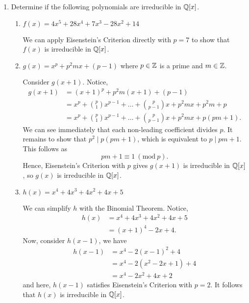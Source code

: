 \documentclass[answers]{exam}
\newcommand{\Mod}[1]{\ (\mathrm{mod}\ #1)}
\begin{document}
\begin{enumerate}
\item Determine if the following polynomials are irreducible in $\mathbb{Q}[x]$.
\begin{enumerate}
\item $f(x) = 4x^5 + 28x^4 + 7x^3 - 28x^2 + 14$
\begin{solution}
We can apply Eisenstein's Criterion directly with $p=7$ to show that
$f(x)$ is irreducible in $\mathbb{Q}[x]$.
\end{solution}
\item $g(x) = x^p + p^2mx + (p-1)$ where $p \in \mathbb{Z}$ is a prime and $m\in \mathbb{Z}$.
\begin{solution}
Consider $g(x+1)$. Notice,
\begin{align*}
g(x+1) &= (x+1)^p + p^2m(x+1) + (p-1)\\
&= x^p + \binom{p}{1}x^{p-1} + \dots + \binom{p}{p-1}x + p^2mx + p^2m + p\\
&= x^p + \binom{p}{1}x^{p-1} + \dots + \binom{p}{p-1}x + p^2mx + p(pm + 1).
\end{align*} 
We can see immediately that each non-leading coefficient divides $p$. It remains
to show that $p^2 \mid p(pm + 1)$, which is equivalent to $p \mid pm +1$. This
follows as
\begin{equation*}
pm + 1 \equiv 1 \Mod{p}.
\end{equation*}
Hence, Eisenstein's Criterion with $p$ gives $g(x+1)$ is irreducible in
$\mathbb{Q}[x]$, so $g(x)$ is irreducible in $\mathbb{Q}[x]$.
\end{solution}

\item $h(x) = x^4 + 4x^3 + 4x^2 + 4x + 5$
\begin{solution}
We can simplify $h$ with the Binomial Theorem. Notice,
\begin{align*}
h(x) &= x^4 + 4x^3 + 4x^2 + 4x + 5\\
&= (x+1)^4 - 2x + 4.
\end{align*}
Now, consider $h(x-1)$, we have
\begin{align*}
h(x-1) &= x^4 - 2(x-1)^2 + 4\\
&= x^4 - 2(x^2 - 2x + 1) + 4\\ 
&= x^4 - 2x^2 + 4x + 2
\end{align*}
and here, $h(x-1)$ satisfies Eisenstein's Criterion with $p = 2$. It follows
that $h(x)$ is irreducible in $\mathbb{Q}[x]$.
\end{solution}
\end{enumerate}


\end{enumerate}
\end{document}
